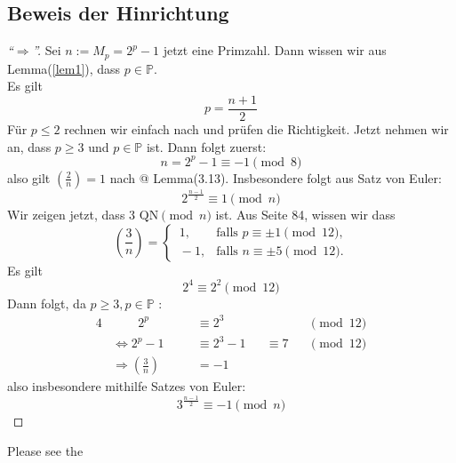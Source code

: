 \documentclass{article}
\makeatletter
\newcommand{\Prime}{\ensuremath{\mathbb{P}}}
\newcommand{\Rmnum}[1]{\expandafter\@slowromancap\romannumeral #1@}
\makeatother
\begin{document}
\subsection{Beweis der Hinrichtung}
\begin{proof}[``$\Rightarrow$'']
Sei $n := M_p = 2^{p} - 1$ jetzt eine Primzahl. Dann wissen wir aus Lemma(\ref{lem1}), dass $p \in \Prime.$ \\Es gilt
\begin{equation}\label{nPequ}
 p = \frac{n + 1}{2}
\end{equation}
F\"{u}r $p \leq 2$ rechnen wir einfach nach und pr\"{u}fen die Richtigkeit. Jetzt nehmen wir an, dass $p \geq 3 $ und $ p \in \Prime$ ist. Dann folgt zuerst:
\[
	n = 2^p - 1 \equiv{-1} \pmod{8}
\]
also gilt $(\frac{2}{n}) = 1$ nach \cite{script} \Rmnum{2} Lemma(3.13). Insbesondere
folgt aus Satz von Euler:
\begin{equation}\label{twoPo}
	2^{\frac{n-1}{2}} \equiv{1} \pmod{n}
\end{equation}
Wir zeigen jetzt, dass 3 $\mbox{QN}\pmod{n}$ ist.
Aus \cite{script} Seite 84, wissen wir dass
\[
	\left(\frac{3}{n} \right) = 
	\begin{cases}
	\,1, &\text{falls $p \equiv{\pm1} \pmod{12}$,}\\
	\,-1, &\text{falls $n \equiv{\pm5} \pmod{12}$.}
	\end{cases}
\]
Es gilt
\[
	2^4 \equiv{2^2} \pmod{12}
\]
Dann folgt, da $p \geq 3, p \in \Prime$ :
\begin{alignat*}{4}
	&\phantom{\Rightarrow a} 2^{p}     		&&\equiv{2^3}      &&		   &&\pmod{12}\\
	&\Leftrightarrow 2^{p} - 1 	\quad 		&&\equiv{2^3 - 1}  &&\equiv{7} &&\pmod{12}\\
	&\Rightarrow \left( \frac{3}{n} \right) &&= -1			   &&			   &
\end{alignat*}
also insbesondere mithilfe Satzes von Euler:
\begin{equation}\label{threePot}
	3^{\frac{n-1}{2}} \equiv{-1} \pmod{n}
\end{equation}

\end{proof}
\newpage
\begin{appendix}

\end{appendix}

Please see the \cite{zahlentheorie}
\newpage


\end{document}
